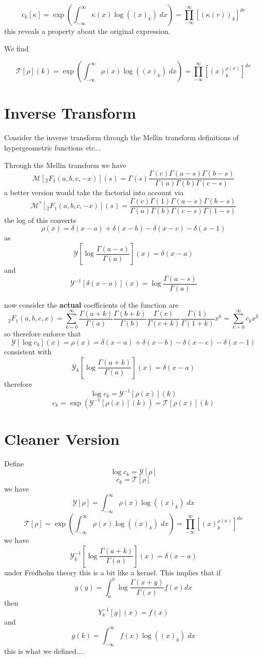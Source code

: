 \documentclass{article}
\begin{document}
$$
c_k[\kappa] = \exp\left(\int_{-\infty}^\infty \kappa(x) \log((x)_k) \; dx \right) = \prod_{-\infty}^\infty \left[ (\kappa(r))_k \right]^{dr}
$$
this reveals a property about the original expression.

We find

$$
\mathcal{T}[\rho](k) = \exp\left(\int_{-\infty}^\infty \rho(x) \log((x)_k) \; dx \right) = \prod_{-\infty}^\infty \left[ (x)_k^{\rho(x)}\right]^{dx}
$$


\section{Inverse Transform}
Consider the inverse transform through the Mellin transform definitions of hypergeometric functions etc...

Through the Mellin transform we have 
$$
\mathcal{M}[_2F_1(a,b,c,-x)](s) = \Gamma(s) \frac{\Gamma(c) \Gamma(a-s)\Gamma(b-s)}{\Gamma(a)\Gamma(b)\Gamma(c-s)}
$$
a better version would take the factorial into account via
$$
\mathcal{M}^*[_2F_1(a,b,c,-x)](s) = \frac{\Gamma(c)\Gamma(1) \Gamma(a-s)\Gamma(b-s)}{\Gamma(a)\Gamma(b)\Gamma(c-s)\Gamma(1-s)}
$$
the log of this converts 
$$
\rho(x) = \delta(x-a) + \delta(x-b) - \delta(x-c) - \delta(x-1)
$$
as 
$$
\mathcal{Y}\left[ \log \frac{\Gamma(a-s)}{\Gamma(a)}\right](x) = \delta(x-a)
$$
and 
$$
\mathcal{Y}^{-1}\left[\delta(x-a)\right](x) =  \log \frac{\Gamma(a-s)}{\Gamma(a)} 
$$

now consider the \textbf{actual} coefficients of the function are
$$
_2F_1(a,b,c,x) = \sum_{k=0}^\infty \frac{\Gamma(a+k)}{\Gamma(a)}\frac{\Gamma(b+k)}{\Gamma(b)}\frac{\Gamma(c)}{\Gamma(c+k)}\frac{\Gamma(1)}{\Gamma(1+k)} x^k = \sum_{k=0}^\infty c_k x^k
$$
so therefore enforce that 
$$
\mathcal{Y}[ \log c_k](x) = \rho(x) = \delta(x-a) + \delta(x-b) - \delta(x-c) - \delta(x-1)
$$
consistent with
$$
\mathcal{Y}_k\left[ \log \frac{\Gamma(a+k)}{\Gamma(a)}\right](x) = \delta(x-a)
$$
therefore 
$$
\log c_k = \mathcal{Y}^{-1}[\rho(x)](k)
$$
$$
c_k = \exp\left(\mathcal{Y}^{-1}[\rho(x)](k)\right) = \mathcal{T}[\rho(x)](k)
$$


\section{Cleaner Version}
Define
$$
\log c_k = \mathcal{Y}[\rho]
$$
$$
c_k = \mathcal{T}[\rho]
$$
we have 
$$
\mathcal{Y}[\rho] = \int_{-\infty}^\infty \rho(x) \log( (x)_k ) \; dx
$$
$$
\mathcal{T}[\rho] = \exp\left(\int_{-\infty}^\infty \rho(x) \log( (x)_k ) \; dx\right) = \prod_{-\infty}^\infty \left[ (x)_k^{\rho(x)}\right]^{dx}
$$
we have
$$
\mathcal{Y}^{-1}_k\left[ \log \frac{\Gamma(a+k)}{\Gamma(a)}\right](x) = \delta(x-a)
$$
under Fredholm theory this is a bit like a kernel. This implies that if
$$
g(y) = \int_a^b \log \frac{\Gamma(x+y)}{\Gamma(x)} f(x) dx 
$$
then 
$$
Y^{-1}_k [g](x) = f(x)
$$
and 
$$
g(k) = \int_{-\infty}^\infty f(x) \log((x)_k) \; dx
$$
this is what we defined....
\end{document}
